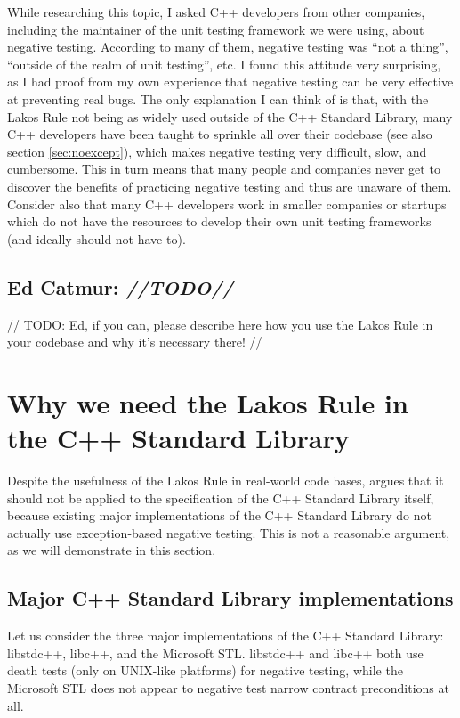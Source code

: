 While researching this topic, I asked C++ developers from other companies, including the maintainer of the unit testing framework we were using, about negative testing. According to many of them, negative testing was ``not a thing'', ``outside of the realm of unit testing'', etc. I found this attitude very surprising, as I had proof from my own experience that negative testing can be very effective at preventing real bugs. The only explanation I can think of is that, with the Lakos Rule not being as widely used outside of the C++ Standard Library, many C++ developers have been taught to sprinkle  all over their codebase (see also section \ref{sec:noexcept}), which makes negative testing very difficult, slow, and cumbersome. This in turn means that many people and companies never get to discover the benefits of practicing negative testing and thus are unaware of them. Consider also that many C++ developers work in smaller companies or startups which do not have the resources to develop their own unit testing frameworks (and ideally should not have to).

\subsection{Ed Catmur: \emph{//TODO//}}

// TODO: Ed, if you can, please describe here how you use the Lakos Rule in your codebase and why it's necessary there! //

\section{Why we need the Lakos Rule in the C++ Standard Library}
\label{sec:stdlib}

Despite the usefulness of the Lakos Rule in real-world code bases, \cite{P1656R2} argues that it should not be applied to the specification of the C++ Standard Library itself, because existing major implementations of the C++ Standard Library do not actually use exception-based negative testing. This is not a reasonable argument, as we will demonstrate in this section.

\subsection{Major C++ Standard Library implementations}
\label{subsec:major}

Let us consider the three major implementations of the C++ Standard Library: libstdc++, libc++, and the Microsoft STL. libstdc++ and libc++ both use death tests (only on UNIX-like platforms) for negative testing, while the Microsoft STL does not appear to negative test narrow contract preconditions at all.

